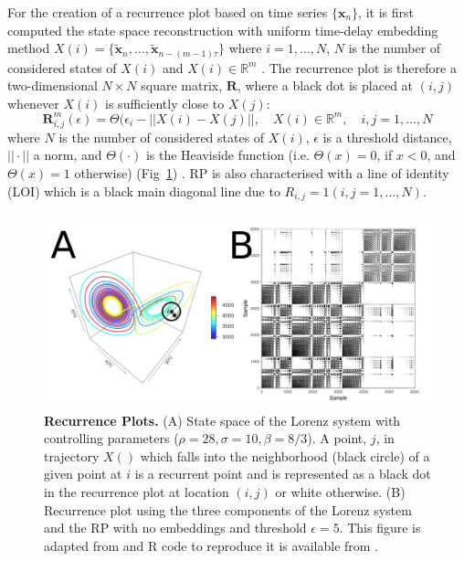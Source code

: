 For the creation of a recurrence plot based on time series $\{ \boldsymbol{x}_n \}$, 
it is first computed the state space reconstruction 
with uniform time-delay embedding method 
$X(i)=\{ \boldsymbol{ \tilde{x} }_n, \dots,  \boldsymbol{ \tilde{x} }_{n -(m-1)\tau} \}$
where $i=1,\dots,N$, $N$ is the number of considered states of $X(i)$ 
and $X(i) \in \mathbb{R}^m$ \cite{eckmann1987}.
The recurrence plot is therefore a two-dimensional $N \times N$ square matrix, $\mathbf{R}$, 
where a black dot is placed at $(i,j)$ whenever $X(i)$ is sufficiently close to $X(j)$: 
\begin{equation}
\mathbf{R}^{m}_{i,j} (\epsilon) = \Theta ( \epsilon_i - || X(i) - X(j) ||, \quad X(i) \in \mathbb{R}^m, \quad i,j=1,\dots,N
\end{equation}
where $N$ is the number of considered states of $X(i)$, $\epsilon$ is a threshold 
distance, $|| \cdotp ||$ a norm, and $\Theta(\cdotp)$ is the Heaviside 
function (i.e. $\Theta(x)=0$, if $x<0$, and $\Theta(x)=1$ otherwise) 
(Fig~\ref{fig:mrp}) \cite{eckmann1987, marwan2007,marwan2015}.
RP is also characterised with a line of identity (LOI) which is a black main 
diagonal line due to $ R_{i,j}=1 (i,j=1,\dots,N)$. 
\begin{figure}[!h]
  \centering
    \includegraphics[width=1.0\textwidth]{rp}
    \caption{
	{\bf Recurrence Plots.} 
	(A) State space of the Lorenz system with controlling parameters ($\rho=28, \sigma=10, \beta=8/3$). 
	A point, $j$, in trajectory $X()$ which falls into the neighborhood (black circle) 
	of a given point at $i$ is a recurrent point and is represented as a 
	black dot in the recurrence plot at location $(i, j)$ or white otherwise.
	(B) Recurrence plot using the 
	three components of the Lorenz system and the RP with no embeddings and threshold $\epsilon=5$.
	This figure is adapted from \cite{marwan2015} and R code to reproduce it is available from \cite{hwum2018}.
	}
    \label{fig:mrp}
\end{figure}






